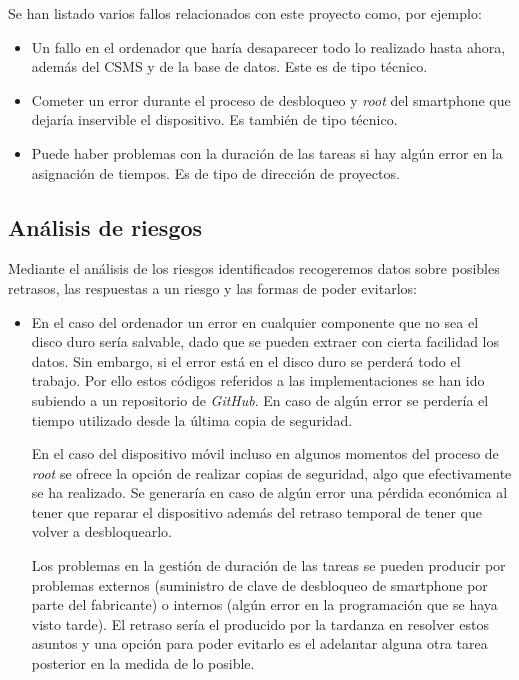 \documentclass[12pt,a4paper,onecolumn,oneside]{report}
\begin{document}
Se han listado varios fallos relacionados con este proyecto como, por ejemplo:

\begin{itemize}
\item Un fallo en el ordenador que haría desaparecer todo lo realizado hasta ahora, además del CSMS y de la base de datos. Este es de tipo técnico.
\item Cometer un error durante el proceso de desbloqueo y \textit{root} del smartphone que dejaría inservible el dispositivo. Es también de tipo técnico.
\item Puede haber problemas con la duración de las tareas si hay algún error en la asignación de tiempos. Es de tipo de dirección de proyectos.
\end{itemize}

\subsection{Análisis de riesgos}

Mediante el análisis de los riesgos identificados recogeremos datos sobre posibles retrasos, las respuestas a un riesgo y las formas de poder evitarlos:

\begin{itemize}
\item En el caso del ordenador un error en cualquier componente que no sea el disco duro sería salvable, dado que se pueden extraer con cierta facilidad los datos. Sin embargo, si el error está en el disco duro se perderá todo el trabajo. Por ello estos códigos referidos a las implementaciones se han ido subiendo a un repositorio de \textit{GitHub}. En caso de algún error se perdería el tiempo utilizado desde la última copia de seguridad.

En el caso del dispositivo móvil incluso en algunos momentos del proceso de \textit{root} se ofrece la opción de realizar copias de seguridad, algo que efectivamente se ha realizado. Se generaría en caso de algún error una pérdida económica al tener que reparar el dispositivo además del retraso temporal de tener que volver a desbloquearlo.

Los problemas en la gestión de duración de las tareas se pueden producir por problemas externos (suministro de clave de desbloqueo de smartphone por parte del fabricante) o internos (algún error en la programación que se haya visto tarde). El retraso sería el producido por la tardanza en resolver estos asuntos y una opción para poder evitarlo es el adelantar alguna otra tarea posterior en la medida de lo posible.

\end{itemize}
\end{document}
